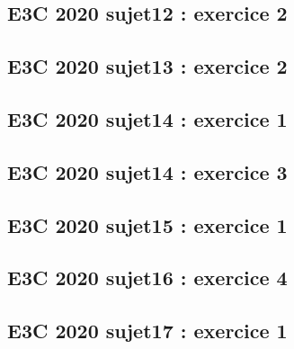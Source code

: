 \documentclass[lang=fr,edition=teacher,layout=sheet]{mxbook}
\begin{document}
\begingroup\endgroup
\par\bigskip
{}\subsection*{E3C 2020 sujet12 : exercice 2}
\begingroup\endgroup
\par\bigskip
{}\subsection*{E3C 2020 sujet13 : exercice 2}
\begingroup\endgroup
\par\bigskip
{}\subsection*{E3C 2020 sujet14 : exercice 1}
\begingroup\endgroup
\par\bigskip
{}\subsection*{E3C 2020 sujet14 : exercice 3}
\begingroup\endgroup
\par\bigskip
{}\subsection*{E3C 2020 sujet15 : exercice 1}
\begingroup\endgroup
\par\bigskip
{}\subsection*{E3C 2020 sujet16 : exercice 4}
\begingroup\endgroup
\par\bigskip
{}\subsection*{E3C 2020 sujet17 : exercice 1}
\begingroup\endgroup
\end{document}
